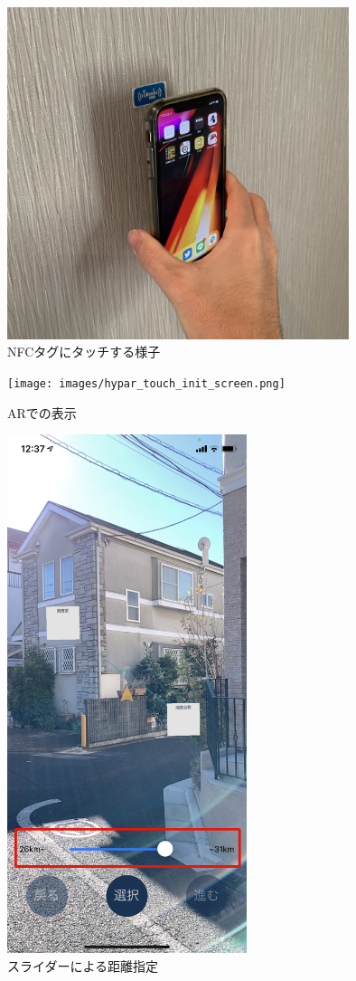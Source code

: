\begin{figure}[htbp]
  \centering
  \includegraphics[width=100mm]{images/touch_nfc.jpg}
  \caption{NFCタグにタッチする様子} \label{fig:touch_nfc}
\end{figure}

\begin{figure}[htbp]
  \begin{minipage}{0.5\hsize}
    \centering
    \texttt{[image: images/hypar\_touch\_init\_screen.png]}
    \caption{ARでの表示} \label{fig:hypar_touch_init_screen}
  \end{minipage}
  \begin{minipage}{0.5\hsize}
    \centering
    \includegraphics[width=70mm]{images/hypar_touch_slider.png}
    \caption{スライダーによる距離指定} \label{fig:hypar_touch_slider}
  \end{minipage}
\end{figure}

